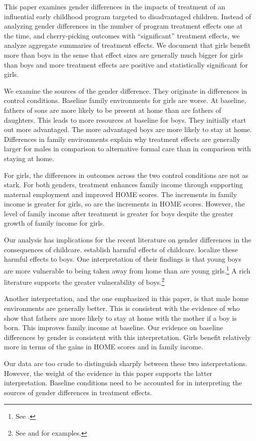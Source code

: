 This paper examines gender differences in the impacts of treatment of an influential early childhood program targeted to disadvantaged children. Instead of  analyzing gender differences in the number of program treatment effects one at the time, and cherry-picking outcomes with ``significant'' treatment effects, we analyze aggregate summaries of treatment effects. We document that girls benefit more than boys in the sense that effect sizes are generally much bigger for girls than boys and more treatment effects are positive and statistically significant for girls.

We examine the sources of the gender difference. They originate in differences in control conditions. Baseline family environments for girls are worse. At baseline, fathers of sons are more likely to be present at home than are fathers of daughters. This leads to more resources at baseline for boys. They initially start out more advantaged. The more advantaged boys are more likely to stay at home. Differences in family environments explain why treatment effects are generally larger for males in comparison to alternative formal care than in comparison with staying at home. 

For girls, the differences in outcomes across the two control conditions are not as stark. For both genders, treatment enhances family income through supporting maternal employment and improved HOME scores. The increments in family income is greater for girls, so are the increments in HOME scores. However, the level of family income after treatment is greater for boys despite the greater growth of family income for girls.

Our analysis has implications for the recent literature on gender differences in the consequences of childcare. \citet{Baker_etal_2008_Universal_Childcare_JPE,Baker_Gruber_Milligan_2015_Noncog_Defects} establish harmful effects of childcare. \citet{Kottelenberg_Lehrer_2014_Gender-Effects} localize these harmful effects to boys. One interpretation of their findings is that young boys are more vulnerable to being taken away from home than are young girls.\footnote{See \citet{Garcia_etal_2019_ECE_IMHJ}.} A rich literature supports the greater vulnerability of boys.\footnote{See \citet{Golding_Fitzgerald_2017_IMHJ} and \citet{Schore_2017_IMHJ} for examples.}

Another interpretation, and the one emphasized in this paper, is that male home environments are generally better. This is consistent with the evidence of \citet{Dahl_Moretti_2008_RES} who show that fathers are more likely to stay at home with the mother if a boy is born. This improves family income at baseline. Our evidence on baseline differences by gender is consistent with this interpretation. Girls benefit relatively more in terms of the gains in HOME scores and in family income.

Our data are too crude to distinguish sharply between these two interpretations. However, the weight of the evidence in this paper supports the latter interpretation. Baseline conditions need to be accounted for in interpreting the sources of gender differences in treatment effects. 